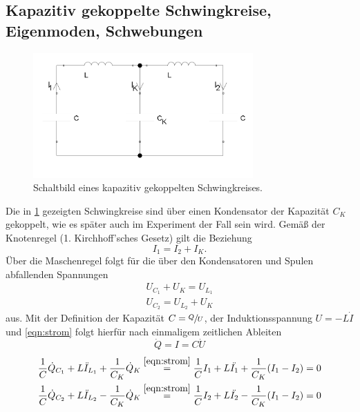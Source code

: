 \subsection{Kapazitiv gekoppelte Schwingkreise, Eigenmoden, Schwebungen}
\begin{figure}
    \centering
    \includegraphics[width=0.75\textwidth]{plots/allg_gekopp_schwingkreis.png}
    \caption{Schaltbild eines kapazitiv gekoppelten Schwingkreises.}
    \label{fig:kap_gekopp}
\end{figure}
Die in \ref{fig:kap_gekopp} gezeigten Schwingkreise sind über einen Kondensator der Kapazität $C_K$ gekoppelt, wie es 
später auch im Experiment der Fall sein wird. 
Gemäß der Knotenregel (1. Kirchhoff'sches Gesetz) gilt die Beziehung
\begin{equation}
    I_1 = I_2 + I_K .
    \label{eqn:strom}
\end{equation}
Über die Maschenregel folgt für die über den Kondensatoren und Spulen abfallenden Spannungen 
\begin{align} %
    U_{C_1} + U_K = U_{L_1} 
    \label{eqn:masche1} \\
    U_{C_2} = U_{L_2} + U_K  
    \label{eqn:masche2} 
\end{align}
aus.
Mit der Definition der Kapazität ${C=\sfrac{Q}{U}}$, der Induktionsspannung ${U=- L \dot{I}}$ und \eqref{eqn:strom} folgt 
hierfür nach einmaligem zeitlichen Ableiten 
\begin{equation}
    \dot{Q} = I = C \dot{U} 
\end{equation}
\begin{align}
    \frac{1}{C} \dot{Q}_{C_1} + L \ddot{I}_{L_1} + \frac{1}{C_K} \dot{Q}_{K} \stackrel{\eqref{eqn:strom}}{=} 
    \frac{1}{C} I_1 + L \ddot{I_1} + \frac{1}{C_K} (I_1 - I_2) = 0 \label{eqn:dgl1} \\
    \frac{1}{C} \dot{Q}_{C_2} + L \ddot{I}_{L_2} - \frac{1}{C_K} \dot{Q}_{K} \stackrel{\eqref{eqn:strom}}{=}
    \frac{1}{C} I_2 + L \ddot{I_2} - \frac{1}{C_K} (I_1 - I_2) = 0 \label{eqn:dgl2}
\end{align}

